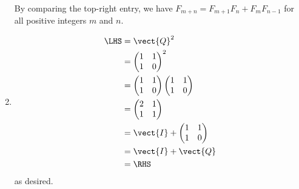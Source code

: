 \begin{enumerate}
          By comparing the top-right entry, we have \(F_{m + n} = F_{m + 1} F_n + F_m F_{n - 1}\) for all positive integers \(m\) and \(n\).

    \item \begin{align*}
              \LHS & = \vect{Q}^2                   \\
                   & = \begin{pmatrix}
                           1 & 1 \\ 1 & 0
                       \end{pmatrix}^2              \\
                   & = \begin{pmatrix}
                           1 & 1 \\ 1 & 0
                       \end{pmatrix} \begin{pmatrix}
                                         1 & 1 \\ 1 & 0
                                     \end{pmatrix} \\
                   & = \begin{pmatrix}
                           2 & 1 \\ 1 & 1
                       \end{pmatrix}               \\
                   & = \vect{I} + \begin{pmatrix}
                                      1 & 1 \\ 1 & 0
                                  \end{pmatrix}    \\
                   & = \vect{I} + \vect{Q}          \\
                   & = \RHS
          \end{align*}
          as desired.


\end{enumerate}
